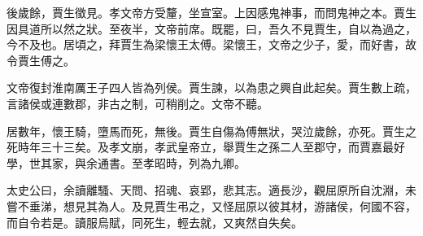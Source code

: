 後歲餘，賈生徵見。孝文帝方受釐，坐宣室。上因感鬼神事，而問鬼神之本。賈生因具道所以然之狀。至夜半，文帝前席。既罷，曰，吾久不見賈生，自以為過之，今不及也。居頃之，拜賈生為梁懷王太傅。梁懷王，文帝之少子，愛，而好書，故令賈生傅之。

文帝復封淮南厲王子四人皆為列侯。賈生諫，以為患之興自此起矣。賈生數上疏，言諸侯或連數郡，非古之制，可稍削之。文帝不聽。

居數年，懷王騎，墮馬而死，無後。賈生自傷為傅無狀，哭泣歲餘，亦死。賈生之死時年三十三矣。及孝文崩，孝武皇帝立，舉賈生之孫二人至郡守，而賈嘉最好學，世其家，與余通書。至孝昭時，列為九卿。

太史公曰，余讀離騷、天問、招魂、哀郢，悲其志。適長沙，觀屈原所自沈淵，未嘗不垂涕，想見其為人。及見賈生弔之，又怪屈原以彼其材，游諸侯，何國不容，而自令若是。讀服烏賦，同死生，輕去就，又爽然自失矣。